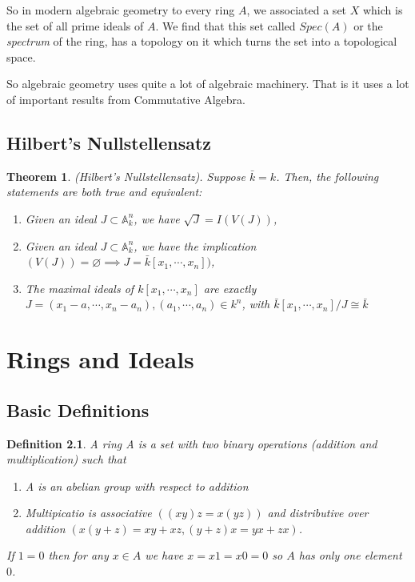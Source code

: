 \documentclass[]{report}
\newtheorem{theorem}{Theorem}[section]
\newtheorem{defn}[theorem]{Definition}
\begin{document}
So in modern algebraic geometry to every ring $A$, we associated a set $X$ which is the set of all prime ideals of $A$. We find that this set called $Spec(A)$ or the \textit{spectrum} of the ring, has a topology on it which turns the set into a topological space. 

So algebraic geometry uses quite a lot of algebraic machinery. That is it uses a lot of important results from Commutative Algebra. 

\section{Hilbert's Nullstellensatz}

\begin{theorem}
    (Hilbert's Nullstellensatz). Suppose $\bar{k} = k$. Then, the following statements are both true and equivalent:
    \begin{enumerate}
        \item Given an ideal $J\subset \mathbb{A}^n_k$, we have $\sqrt{J} = I(V(J))$,
        \item Given an ideal $J\subset \mathbb{A}^n_k$, we have the implication $(V(J)) = \varnothing \implies J = \bar{k}[x_1,\cdots,x_n])$,
        \item The maximal ideals of $k[x_1,\cdots,x_n]$ are exactly $J = (x_1-a,\cdots, x_n-a_n), (a_1,\cdots,a_n)\in k^n$, with $\bar{k}[x_1,\cdots,x_n]/J \cong \bar{k}$
    \end{enumerate}
\end{theorem}


\chapter{Rings and Ideals}
\section{Basic Definitions}
\begin{defn} 
    A ring A is a set with two binary operations (addition and multiplication) such that
\begin{enumerate}
    \item A is an abelian group with respect to addition
    \item Multipicatio is associative $((xy)z = x(yz))$ and distributive over addition $(x(y+z) = xy+xz, (y+z)x = yx + zx)$.  
\end{enumerate}

If $1=0$ then for any $x\in A$ we have $x=x1=x0 =0$ so $A$ has only one element $0$.
\end{defn}
\end{document}

